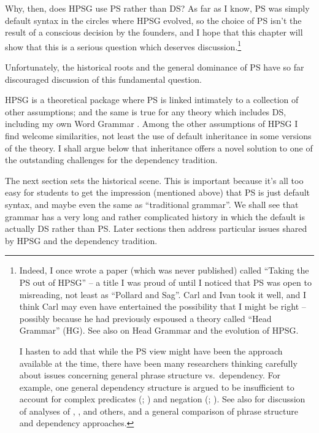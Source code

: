 \documentclass[output=paper
 	        ,biblatex
                ,babelshorthands
                ,newtxmath
                ,draftmode
                ,colorlinks, citecolor=brown
]{langscibook}
\begin{document}
Why, then, does HPSG use PS rather than DS? As far as I know, PS was simply default syntax in the
circles where HPSG evolved, so the choice of PS isn't the result of a conscious decision by the
founders, and I hope that this chapter will show that this is a serious question which deserves
discussion.\footnote{%
  Indeed, I once wrote a paper (which was never published) called ``Taking the PS out of HPSG'' – a
  title I was proud of until I noticed that PS was open to misreading, not least as ``Pollard and
  Sag''. Carl and Ivan took it well, and I think Carl may even have entertained the possibility that
  I might be right – possibly because he had previously espoused a theory called ``Head Grammar''
  (HG). See also  on
    Head Grammar and the evolution of HPSG.

I hasten to add that while the PS view might have been the approach available at the time,
  there have been many researchers thinking carefully about issues concerning general phrase structure
  vs.\ dependency. For example, one general dependency structure is argued to be insufficient to
  account for complex predicates (\citealt{AG2010a-u}; ) and negation
  (\citealt{KS2002a}; ). See also  for discussion of analyses of
  \citet{Eroms2000a}, \citet{GO2009a}, and others, and a general comparison of phrase structure and dependency approaches.
}


Unfortunately, the historical roots and the general dominance of PS have so far discouraged discussion of this fundamental question.

HPSG is a theoretical package where PS is linked intimately to a collection of other assumptions;
and the same is true for any theory which includes DS, including my own Word Grammar
\citep{Hudson84a-u,Hudson90a-u,Hudson1998,Hudson2007a-u,Hudson2010b-u,Gisborne2010,GisborneTBA,Duran-Eppler2011,TraugottTrousdale2013}. Among
the other assumptions of HPSG I find welcome similarities, not least the use of default inheritance
in some versions of the theory. I shall argue below that inheritance offers a novel solution to one
of the outstanding challenges for the dependency tradition.

The next section sets the historical scene. This is important because it's all too easy for students
to get the impression (mentioned above) that PS is just default syntax, and maybe even the same as
``traditional grammar''. We shall see that grammar has a very long and rather complicated history in
which the default is actually DS rather than PS. Later sections then address particular issues
shared by HPSG and the dependency tradition.
\end{document}
